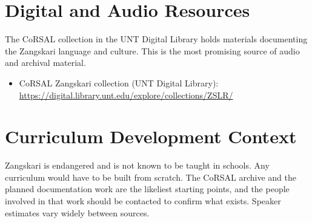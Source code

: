 \documentclass[12pt]{article}
\begin{document}
\section{Digital and Audio Resources}
The CoRSAL collection in the UNT Digital Library holds materials documenting the Zangskari language and culture. This is the most promising source of audio and archival material.
\begin{itemize}
\item CoRSAL Zangskari collection (UNT Digital Library): \url{https://digital.library.unt.edu/explore/collections/ZSLR/}
\end{itemize}

\section{Curriculum Development Context}
Zangskari is endangered and is not known to be taught in schools. Any curriculum would have to be built from scratch. The CoRSAL archive and the planned documentation work are the likeliest starting points, and the people involved in that work should be contacted to confirm what exists. Speaker estimates vary widely between sources.
\end{document}
